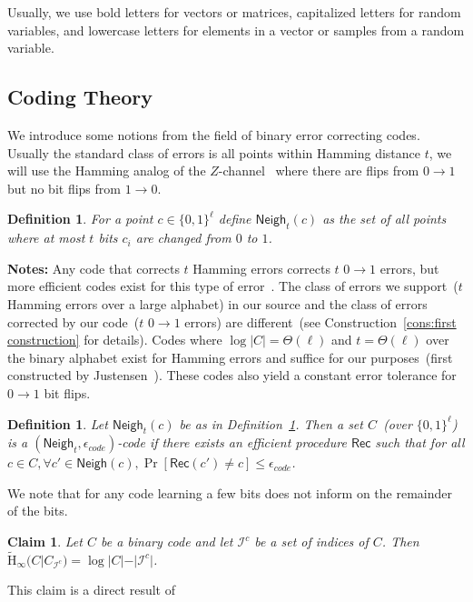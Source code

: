\documentclass[11pt]{article}
\newcommand{\defref}[1]{\mbox{Definition~\ref{#1}}}
\newcommand{\consref}[1]{\mbox{Construction~\ref{#1}}}
\newcommand{\class}[1]{{\ensuremath{\mathsf{#1}}}}
\newcommand{\rec}{\ensuremath{\class{Rec}}\xspace}
\newcommand{\zo}{\ensuremath{\{0, 1\}}}
\newcommand{\neigh}{\ensuremath{\class{Neigh}}\xspace}
\newcommand{\Hav}{\tilde{\mathrm{H}}_\infty}
\newtheorem{definition}[theorem]{Definition}
\newtheorem{claim}[theorem]{Claim}
\begin{document}
Usually, we use bold letters for vectors or matrices, capitalized letters for random variables, and lowercase letters for elements in a vector or samples from a random variable. 

\subsection{Coding Theory}
\label{sec:coding theory}
We introduce some notions from the field of binary error correcting codes.  Usually the standard class of errors  is all points within Hamming distance $t$, we will use the Hamming analog of the $Z$-channel~\cite{tallini2002capacity} where there are flips from $0\rightarrow 1$ but no bit flips from $1\rightarrow 0$.  
\begin{definition}
\label{def:hamming z channel}
For a point $c\in \zo^\ell$ define $\neigh_t(c) $ as the set of all points where at most $t$ bits $c_i$ are changed from $0$ to $1$. 
\end{definition}
\textbf{Notes:} Any code that corrects $t$ Hamming errors corrects $t$ $0\rightarrow 1$ errors, but more efficient codes  exist for this type of error~\cite{tallini2002capacity}.
The class of errors we support~($t$ Hamming errors over a large alphabet) in our source and the class of errors corrected by our code~($t$ $0\rightarrow 1$ errors) are different~(see \consref{cons:first construction} for details).  Codes where $\log |C| = \Theta(\ell)$ and $t = \Theta(\ell)$ over the binary alphabet exist for Hamming errors and suffice for our purposes~(first constructed by Justensen~\cite{justesen1972class}).  These codes also yield a constant error tolerance for $0\rightarrow 1$ bit flips.

\begin{definition}
Let $\neigh_t(c)$ be as in \defref{def:hamming z channel}.  Then a set $C$~(over $\zo^\ell$) is a $(\neigh_t, \epsilon_{code})$-code if there exists an efficient procedure $\rec$ such that for all $c\in C, \forall c'\in \neigh(c), \Pr[\rec(c') \neq c] \leq \epsilon_{code}$.
\end{definition}

We note that for any code learning a few bits does not inform on the remainder of the bits.  

\begin{claim} 
\label{cl:many locations ent}
Let $C$ be a binary code and let $\mathcal{I}^c$ be a set of indices of $C$.  Then $\Hav(C | C_{\mathcal{I}^c}) = \log |C| - |\mathcal{I}^c|$.
\end{claim}
This claim is a direct result of \cite[Lemma 2.2b]{DBLP:journals/siamcomp/DodisORS08}
\end{document}

